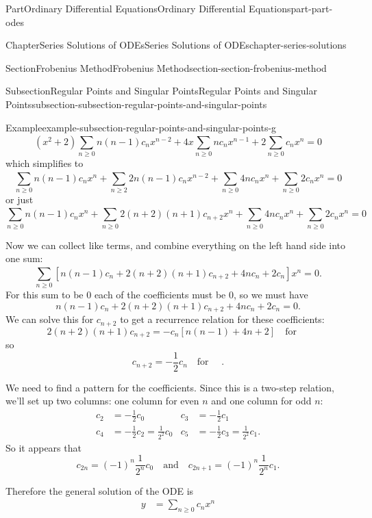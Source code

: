 \documentclass[twoside,10pt,]{book}
\numberwithin{equation}{part}
\newcommand{\qq}[1]{\quad\text{#1}\quad}
\begin{document}
\begin{partptx}{Part}{Ordinary Differential Equations}{}{Ordinary Differential Equations}{}{}{part-part-odes}
\begin{chapterptx}{Chapter}{Series Solutions of ODEs}{}{Series Solutions of ODEs}{}{}{chapter-series-solutions}
\begin{sectionptx}{Section}{Frobenius Method}{}{Frobenius Method}{}{}{section-section-frobenius-method}
\begin{subsectionptx}{Subsection}{Regular Points and Singular Points}{}{Regular Points and Singular Points}{}{}{subsection-subsection-regular-points-and-singular-points}
\begin{example}{Example}{}{example-subsection-regular-points-and-singular-points-g}
\begin{equation*}
(x^{2}+2)\sum_{n\geq0}^{}n(n-1)c_{n}x^{n-2}+4x\sum_{n\geq0}^{}nc_{n}x^{n-1}+2\sum_{n\geq0}^{}c_{n}x^{n} = 0
\end{equation*}
which simplifies to%
\begin{equation*}
\sum_{n\geq0}^{}n(n-1)c_{n}x^{n}+\sum_{n\geq2}^{}2n(n-1)c_{n}x^{n-2}+\sum_{n\geq0}^{}4nc_{n}x^{n}+\sum_{n\geq0}^{}2c_{n}x^{n} = 0
\end{equation*}
or just%
\begin{equation*}
\sum_{n\geq0}^{}n(n-1)c_{n}x^{n}+\sum_{n\geq0}^{}2(n+2)(n+1)c_{n+2}x^{n}+\sum_{n\geq0}^{}4nc_{n}x^{n}+\sum_{n\geq0}^{}2c_{n}x^{n} = 0
\end{equation*}
%
\par
Now we can collect like terms, and combine everything on the left hand side into one sum:%
\begin{equation*}
\sum_{n\geq0}^{}\left[n(n-1)c_{n}+2(n+2)(n+1)c_{n+2}+4nc_{n}+2c_{n}\right]x^{n} = 0.
\end{equation*}
For this sum to be \(0\) each of the coefficients must be \(0\), so we must have%
\begin{equation*}
n(n-1)c_{n}+2(n+2)(n+1)c_{n+2}+4nc_{n}+2c_{n} = 0.
\end{equation*}
We can solve this for \(c_{n+2}\) to get a recurrence relation for these coefficients:%
\begin{equation*}
2(n+2)(n+1)c_{n+2} = -c_{n}[n(n-1)+4n+2] \qq{for }
\end{equation*}
so%
\begin{equation*}
c_{n+2} = -\frac{1}{2}c_{n}\qq{for }.
\end{equation*}
%
\par
We need to find a pattern for the coefficients. Since this is a two-step relation, we'll set up two columns: one column for even \(n\) and one column for odd \(n\):%
\begin{align*}
c_{2} &= -\frac{1}{2}c_{0} & c_{3} &= -\frac{1}{2}c_{1}\\
c_{4} &= -\frac{1}{2}c_{2} = \frac{1}{2^{2}}c_{0} & c_{5} &= -\frac{1}{2}c_{3} = \frac{1}{2^{2}}c_{1}\text{.}
\end{align*}
So it appears that%
\begin{equation*}
c_{2n} = (-1)^{n}\frac{1}{2^{n}}c_{0}\qq{and}c_{2n+1} = (-1)^{n}\frac{1}{2^{n}}c_{1}\text{.}
\end{equation*}
%
\par
Therefore the general solution of the ODE is%
\begin{align*}
y &= \sum_{n\geq0}^{}c_{n}x^{n}\\

\end{align*}
\end{example}
\end{subsectionptx}
\end{sectionptx}
\end{chapterptx}
\end{partptx}
\end{document}
